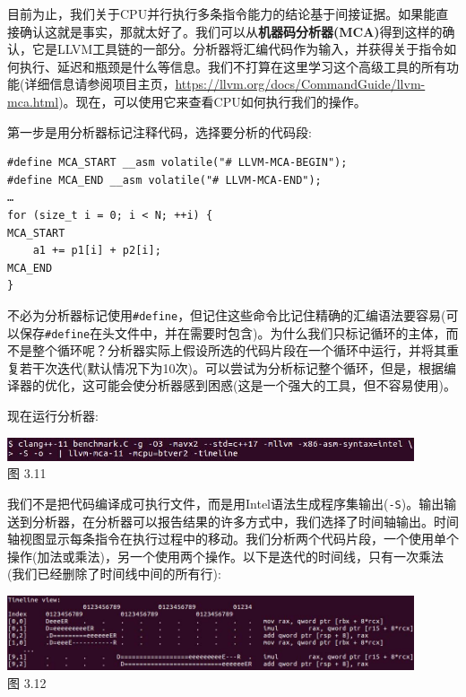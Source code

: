 目前为止，我们关于CPU并行执行多条指令能力的结论基于间接证据。如果能直接确认这就是事实，那就太好了。我们可以从\textbf{机器码分析器(MCA)}得到这样的确认，它是LLVM工具链的一部分。分析器将汇编代码作为输入，并获得关于指令如何执行、延迟和瓶颈是什么等信息。我们不打算在这里学习这个高级工具的所有功能(详细信息请参阅项目主页，\url{https://llvm.org/docs/CommandGuide/llvm-mca.html})。现在，可以使用它来查看CPU如何执行我们的操作。

第一步是用分析器标记注释代码，选择要分析的代码段:

\begin{lstlisting}[style=styleCXX]
#define MCA_START __asm volatile("# LLVM-MCA-BEGIN");
#define MCA_END __asm volatile("# LLVM-MCA-END");
…
for (size_t i = 0; i < N; ++i) {
MCA_START
	a1 += p1[i] + p2[i];
MCA_END
}
\end{lstlisting}

不必为分析器标记使用\texttt{\#define}，但记住这些命令比记住精确的汇编语法要容易(可以保存\texttt{\#define}在头文件中，并在需要时包含)。为什么我们只标记循环的主体，而不是整个循环呢？分析器实际上假设所选的代码片段在一个循环中运行，并将其重复若干次迭代(默认情况下为10次)。可以尝试为分析标记整个循环，但是，根据编译器的优化，这可能会使分析器感到困惑(这是一个强大的工具，但不容易使用)。

现在运行分析器:

\begin{center}
\includegraphics[width=0.9\textwidth]{content/1/chapter3/images/11.jpg}\\
图 3.11
\end{center}

我们不是把代码编译成可执行文件，而是用Intel语法生成程序集输出(\texttt{-S})。输出输送到分析器，在分析器可以报告结果的许多方式中，我们选择了时间轴输出。时间轴视图显示每条指令在执行过程中的移动。我们分析两个代码片段，一个使用单个操作(加法或乘法)，另一个使用两个操作。以下是迭代的时间线，只有一次乘法(我们已经删除了时间线中间的所有行):

\begin{center}
\includegraphics[width=0.9\textwidth]{content/1/chapter3/images/12.jpg}\\
图 3.12
\end{center}

